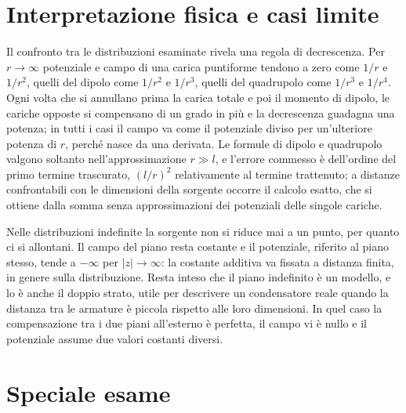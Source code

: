 \documentclass[main.tex]{subfiles}
\begin{document}
	\section*{Interpretazione fisica e casi limite}
	
	Il confronto tra le distribuzioni esaminate rivela una regola di decrescenza. Per $r\to\infty$ potenziale e campo di una carica puntiforme tendono a zero come $1/r$ e $1/r^2$, quelli del dipolo come $1/r^2$ e $1/r^3$, quelli del quadrupolo come $1/r^3$ e $1/r^4$. Ogni volta che si annullano prima la carica totale e poi il momento di dipolo, le cariche opposte si compensano di un grado in più e la decrescenza guadagna una potenza; in tutti i casi il campo va come il potenziale diviso per un'ulteriore potenza di $r$, perché nasce da una derivata. Le formule di dipolo e quadrupolo valgono soltanto nell'approssimazione $r\gg l$, e l'errore commesso è dell'ordine del primo termine trascurato, $(l/r)^2$ relativamente al termine trattenuto; a distanze confrontabili con le dimensioni della sorgente occorre il calcolo esatto, che si ottiene dalla somma senza approssimazioni dei potenziali delle singole cariche.
	
	Nelle distribuzioni indefinite la sorgente non si riduce mai a un punto, per quanto ci si allontani. Il campo del piano resta costante e il potenziale, riferito al piano stesso, tende a $-\infty$ per $|z|\to\infty$: la costante additiva va fissata a distanza finita, in genere sulla distribuzione. Resta inteso che il piano indefinito è un modello, e lo è anche il doppio strato, utile per descrivere un condensatore reale quando la distanza tra le armature è piccola rispetto alle loro dimensioni. In quel caso la compensazione tra i due piani all'esterno è perfetta, il campo vi è nullo e il potenziale assume due valori costanti diversi.
	
	\section*{Speciale esame}
	
\end{document}
